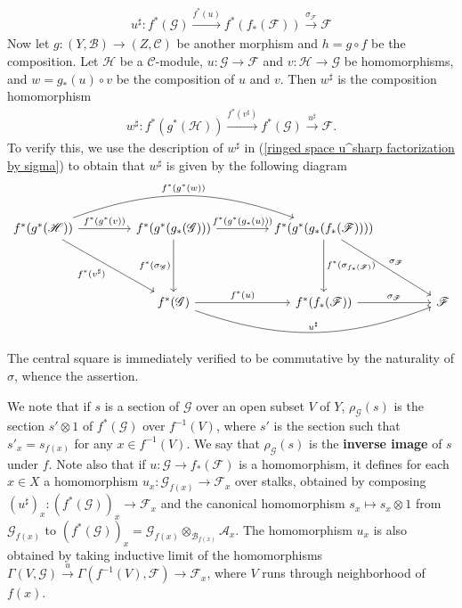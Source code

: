 \begin{align}\label{ringed space u^sharp factorization by sigma}
u^{\sharp}:f^*(\mathscr{G})\stackrel{f^*(u)}{\to}f^*(f_*(\mathscr{F}))\stackrel{\sigma_{\mathscr{F}}}{\to}\mathscr{F}
\end{align}
Now let $g:(Y,\mathscr{B})\to(Z,\mathscr{C})$ be another morphism and $h=g\circ f$ be the composition. Let $\mathscr{H}$ be a $\mathscr{C}$-module, $u:\mathscr{G}\to\mathscr{F}$ and $v:\mathscr{H}\to\mathscr{G}$ be homomorphisms, and $w=g_*(u)\circ v$ be the composition of $u$ and $v$. Then $w^{\sharp}$ is the composition homomorphism
\begin{align}\label{ringed space sharp of a composition}
w^{\sharp}:f^*(g^*(\mathscr{H}))\stackrel{f^*(v^{\sharp})}{\to}f^*(\mathscr{G})\stackrel{u^{\sharp}}{\to}\mathscr{F}.  
\end{align}
To verify this, we use the description of $w^{\sharp}$ in (\ref{ringed space u^sharp factorization by sigma}) to obtain that $w^{\sharp}$ is given by the following diagram
\[\begin{tikzcd}[column sep=15mm,row sep=15mm]
f^*(g^*(\mathscr{H}))\ar[rr,bend left=20pt,"f^*(g^*(w))"]\ar[rd,swap,"f^*(v^{\sharp})"]\ar[r,"f^*(g^*(v))"]&f^*(g^*(g_*(\mathscr{G})))\ar[d,swap,"f^*(\sigma_{\mathscr{G}})"]\ar[r,"f^*(g^*(g_*(u)))"]&f^*(g^*(g_*(f_*(\mathscr{F}))))\ar[d,"f^*(\sigma_{f_*(\mathscr{F})})"]\ar[rd,"\sigma_{\mathscr{F}}"]&\\
&f^*(\mathscr{G})\ar[rr,bend right=20pt,"u^{\sharp}"]\ar[r,"f^*(u)"]&f^*(f_*(\mathscr{F}))\ar[r,"\sigma_{\mathscr{F}}"]&\mathscr{F}
\end{tikzcd}\]
The central square is immediately verified to be commutative by the naturality of $\sigma$, whence the assertion.\par
We note that if $s$ is a section of $\mathscr{G}$ over an open subset $V$ of $Y$, $\rho_{\mathscr{G}}(s)$ is the section $s'\otimes 1$ of $f^*(\mathscr{G})$ over $f^{-1}(V)$, where $s'$ is the section such that $s'_x=s_{f(x)}$ for any $x\in f^{-1}(V)$. We say that $\rho_{\mathscr{G}}(s)$ is the \textbf{inverse image} of $s$ under $f$. Note also that if $u:\mathscr{G}\to f_*(\mathscr{F})$ is a homomorphism, it defines for each $x\in X$ a homomorphism $u_x:\mathscr{G}_{f(x)}\to\mathscr{F}_x$ over stalks, obtained by composing $(u^{\sharp})_x:(f^*(\mathscr{G}))_x\to\mathscr{F}_x$ and the canonical homomorphism $s_x\mapsto s_x\otimes 1$ from $\mathscr{G}_{f(x)}$ to $(f^*(\mathscr{G}))_x=\mathscr{G}_{f(x)}\otimes_{\mathscr{B}_{f(x)}}\mathscr{A}_x$. The homomorphism $u_x$ is also obtained by taking inductive limit of the homomorphisms $\Gamma(V,\mathscr{G})\stackrel{u}{\to}\Gamma(f^{-1}(V),\mathscr{F})\to\mathscr{F}_x$, where $V$ runs through neighborhood of $f(x)$.\par
